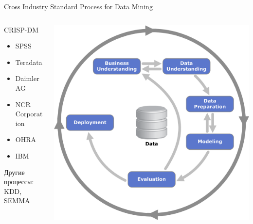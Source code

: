 \documentclass[10pt]{beamer}
\begin{document}
\begin{frame}{Cross Industry Standard Process for Data Mining}

\begin{columns}[C]
    \begin{column}{.5\textwidth}
    	CRISP-DM   	
    	\begin{itemize}
    		\item SPSS 
    		\item Teradata 
   			\item Daimler AG 
    		\item NCR Corporation 
    		\item OHRA
    		\item IBM
		\end{itemize}
		
		Другие процессы: KDD, SEMMA 	
    \end{column}
    \begin{column}{.5\textwidth}
    \vspace{-0em}
	\begin{center}
   		\includegraphics[width=\textwidth]{images/crisp.png}
    \end{center}
    \end{column}
  \end{columns}

\end{frame}
\end{document}
